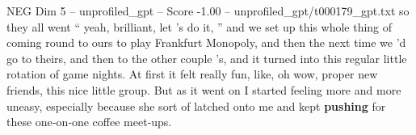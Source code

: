 \begin{textsample}{NEG Dim 5 – unprofiled\_gpt – Score -1.00 – unprofiled\_gpt/t000179\_gpt.txt}  \label{ex:f5_neg_019}
so they all went “ yeah, brilliant, let ’s do it, ” and we set up this whole thing of coming round to ours to play Frankfurt Monopoly, and then the next time we ’d go to theirs, and then to the other couple ’s, and it turned into this regular little rotation of game nights.
At first it felt really fun, like, oh wow, proper new friends, this nice little group.
But as it went on I started feeling more and more uneasy, especially because she sort of latched onto me and kept \textbf{pushing} for these one‑on‑one coffee meet‑ups.

\end{textsample}
